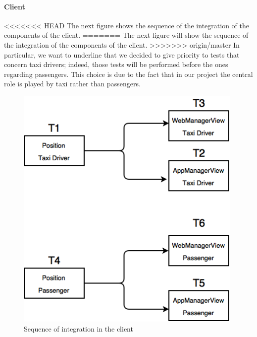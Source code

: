\paragraph{Client}\mbox{}
\newline
<<<<<<< HEAD
The next figure shows the sequence of the integration of the components of the client.
=======
The next figure will show the sequence of the integration of the components of the client.
>>>>>>> origin/master
\newline
In particular, we want to underline that we decided to give priority to tests that concern taxi drivers; indeed, those tests will be performed before the ones regarding passengers. This choice is due to the fact that in our project the central role is played by taxi rather than passengers. 
\newline
\begin{figure}[H]
    \centering
    \includegraphics[width=11cm]{./Images/Client.png}
    \caption{Sequence of integration in the client}
    \label{fig: Sequence of integration in the client}
\end{figure}

\newpage

